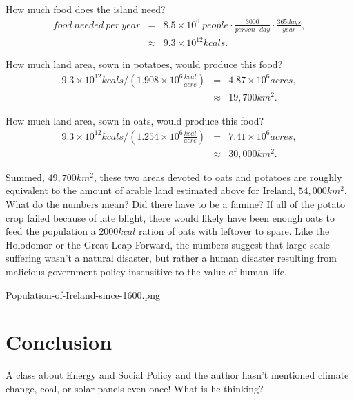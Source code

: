 \documentclass[onecolumn]{article}
\newcommand{\bea}{\begin{eqnarray}}
\newcommand{\eea}{\end{eqnarray}}
\begin{document}
How much food does the island need?
\bea
food~needed~per~year &=& 8.5\times10^6~people
	\cdot \frac{3000}{person\cdot day }
	\cdot \frac{365days}{year} , \nonumber \\
&\approx& 9.3\times 10^{12} kcals . 
\eea       

How much land area, sown in potatoes, would produce this food?
\bea
9.3\times10^{12}kcals /\left(1.908\times 10^6\frac{kcal}{acre}\right) &=& 4.87\times10^6 acres , \nonumber\\
 &\approx& 19,700 km^2 . 
\eea

How much land area, sown in oats, would produce this food?
\bea
9.3\times10^{12}kcals /\left(1.254\times10^6\frac{kcal}{acre}\right) &=& 7.41 \times10^6 acres , \nonumber \\
 &\approx& 30,000 km^2 . 
\eea

Summed, $49,700km^2$, these two areas devoted to oats and potatoes are roughly equivalent to the amount of arable land estimated above for Ireland, $54,000km^2$. \cite{arable_percentage}  
What do the numbers mean?  Did there have to be a famine?  If all of the potato crop failed because of late blight, there would likely have been enough oats to feed the population a $2000kcal$ ration of oats with leftover to spare.  
Like the Holodomor or the Great Leap Forward, the numbers suggest that large-scale suffering wasn't  a natural disaster, but rather a human disaster resulting from malicious government policy insensitive to the value of human life.    


Population-of-Ireland-since-1600.png


\section{Conclusion}
A class about Energy and Social Policy and the author hasn't mentioned climate change, coal, or solar panels even once!  What is he thinking?  
\end{document}
